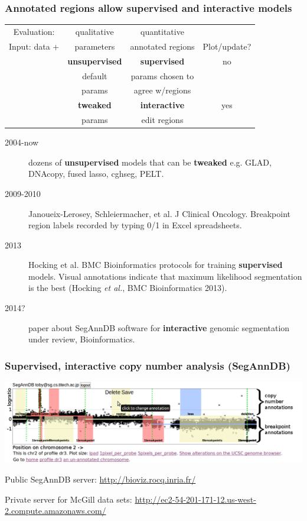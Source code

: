 \documentclass{beamer}
\begin{document}
\begin{frame}
  \frametitle{Annotated regions allow supervised and interactive models}
  \begin{tabular}{c|c|c|c}
    Evaluation: & qualitative & quantitative \\
    Input: data + & parameters & annotated regions & Plot/update?\\
    \hline
    & \textbf{unsupervised} & \textbf{supervised} & no\\
    & default & params chosen to \\
    & params & agree w/regions\\
    \hline
    & \textbf{tweaked} & \textbf{interactive} & yes\\
    & params & edit regions
  \end{tabular}
  \begin{description}
  \item[2004-now] dozens of \textbf{unsupervised} models that can be
    \textbf{tweaked} e.g. GLAD, DNAcopy, fused lasso, cghseg, PELT.
  \item[2009-2010] Janoueix-Lerosey, Schleiermacher, et al. J Clinical
    Oncology. Breakpoint region labels recorded by typing 0/1 in Excel
    spreadsheets.
  \item[2013] Hocking et al. BMC Bioinformatics protocols for training
    \textbf{supervised} models.
  \alert<2>{Visual annotations indicate that maximum likelihood
    segmentation is the best (Hocking \emph{et al.}, BMC
    Bioinformatics 2013).}
  \item[2014?] paper about SegAnnDB software for \textbf{interactive}
    genomic segmentation under review, Bioinformatics.
  \end{description}
\end{frame}

\begin{frame}
  \frametitle{Supervised, interactive copy number analysis (SegAnnDB)}

\includegraphics[width=\textwidth]{new-new-annotations}

\vskip 0.2in
Public SegAnnDB server: \url{http://bioviz.rocq.inria.fr/}

\vskip 0.1in
Private server for McGill data sets:
\small
\url{http://ec2-54-201-171-12.us-west-2.compute.amazonaws.com/}

\end{frame}
\end{document}
